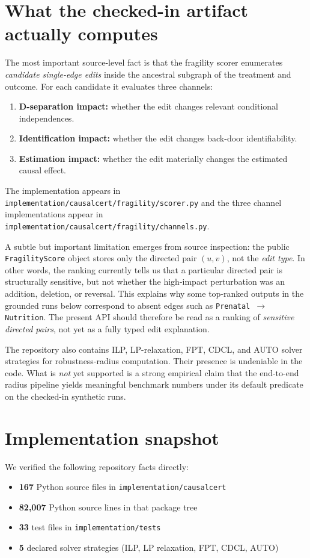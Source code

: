 \documentclass[11pt]{article}
\begin{document}
\section{What the checked-in artifact actually computes}

The most important source-level fact is that the fragility scorer enumerates \emph{candidate single-edge edits} inside the ancestral subgraph of the treatment and outcome. For each candidate it evaluates three channels:
\begin{enumerate}[leftmargin=*]
    \item \textbf{D-separation impact:} whether the edit changes relevant conditional independences.
    \item \textbf{Identification impact:} whether the edit changes back-door identifiability.
    \item \textbf{Estimation impact:} whether the edit materially changes the estimated causal effect.
\end{enumerate}
The implementation appears in \texttt{implementation/causalcert/fragility/scorer.py} and the three channel implementations appear in \texttt{implementation/causalcert/fragility/channels.py}.

A subtle but important limitation emerges from source inspection: the public \texttt{FragilityScore} object stores only the directed pair \((u,v)\), not the \emph{edit type}. In other words, the ranking currently tells us that a particular directed pair is structurally sensitive, but not whether the high-impact perturbation was an addition, deletion, or reversal. This explains why some top-ranked outputs in the grounded runs below correspond to absent edges such as \texttt{Prenatal $\to$ Nutrition}. The present API should therefore be read as a ranking of \emph{sensitive directed pairs}, not yet as a fully typed edit explanation.

The repository also contains ILP, LP-relaxation, FPT, CDCL, and AUTO solver strategies for robustness-radius computation. Their presence is undeniable in the code. What is \emph{not} yet supported is a strong empirical claim that the end-to-end radius pipeline yields meaningful benchmark numbers under its default predicate on the checked-in synthetic runs.

\section{Implementation snapshot}

We verified the following repository facts directly:
\begin{itemize}[leftmargin=*]
    \item \textbf{167} Python source files in \texttt{implementation/causalcert}
    \item \textbf{82,007} Python source lines in that package tree
    \item \textbf{33} test files in \texttt{implementation/tests}
    \item \textbf{5} declared solver strategies (ILP, LP relaxation, FPT, CDCL, AUTO)
\end{itemize}
\end{document}
